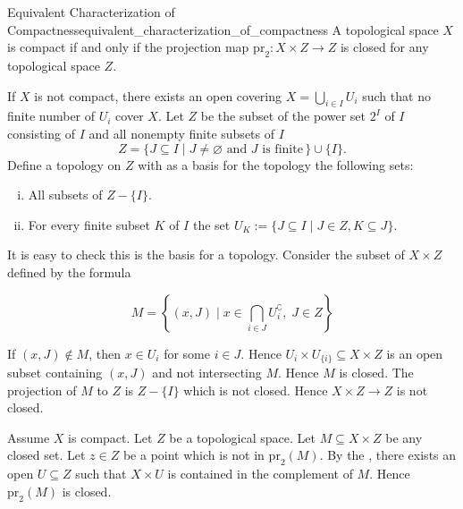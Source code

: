 \documentclass{report}
\begin{document}
\begin{proposition}{Equivalent Characterization of Compactness}{equivalent_characterization_of_compactness}
	A topological space $X$ is compact if and only if the projection map $\mathrm{pr}_2:X\times Z\rightarrow Z$ is closed for any topological space $Z$.
\end{proposition}
\begin{prf}
	If $X$ is not compact, there exists an open covering $X=\bigcup_{i \in I} U_i$ such that no finite number of $U_i$ cover $X$. Let $Z$ be the subset of the power set $2^I$ of $I$ consisting of $I$ and all nonempty finite subsets of $I$
	\[ 
	Z=\{J \subseteq I \mid J \neq \varnothing \text { and } J \text { is finite}\,\} \cup\{I\}.
	\] 
	Define a topology on $Z$ with as a basis for the topology the following sets:
	\begin{enumerate}[(i)]
		\item All subsets of $Z -\{I\}$.
		\item For every finite subset $K$ of $I$ the set $U_K:=\{J \subseteq I \mid J \in Z, K \subseteq J\}$.
	\end{enumerate}
	It is easy to check this is the basis for a topology. Consider the subset of $ X\times Z $ defined by the formula

	$$
	M=\left\{(x, J) \mid x \in \bigcap_{i \in J} U_i^\complement,\;J \in Z\right\}
	$$


	If $(x, J) \notin M$, then $x \in U_i$ for some $i \in J$. Hence $ U_i\times U_{\{i\}} \subseteq   X\times Z$ is an open subset containing $(x,J)$ and not intersecting $M$. Hence $M$ is closed. The projection of $M$ to $Z$ is $Z-\{I\}$ which is not closed. Hence $ X\times Z \rightarrow Z$ is not closed.

	Assume $X$ is compact. Let $Z$ be a topological space. Let $M \subseteq  X\times Z$ be any closed set. Let $z \in Z$ be a point which is not in $\mathrm{pr}_2(M)$. By the , there exists an open $U \subseteq Z$ such that $X\times U$ is contained in the complement of $M$. Hence $\mathrm{pr}_2(M)$ is closed.
\end{prf}
\end{document}
